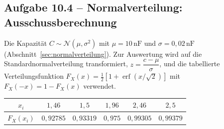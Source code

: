 \subsection*{Aufgabe 10.4 – Normalverteilung: Ausschussberechnung}

Die Kapazität $C \sim \mathcal{N}(\mu, \sigma^2)$ mit $\mu = 10\,\text{nF}$ und
$\sigma = 0{,}02\,\text{nF}$ (Abschnitt~\ref{sec:normalverteilung}). Zur
Auswertung wird auf die Standardnormalverteilung transformiert,
$z = \dfrac{c - \mu}{\sigma}$, und die tabellierte Verteilungsfunktion
$F_X(x) = \tfrac12\!\left[1 + \operatorname{erf}\!\left(x/\sqrt{2}\right)\right]$
mit $F_X(-x) = 1 - F_X(x)$ verwendet.

\begin{center}
\begin{tabular}{c|ccccc}
$x_i$ & $1{,}46$ & $1{,}5$ & $1{,}96$ & $2{,}46$ & $2{,}5$ \\ \hline
$F_X(x_i)$ & $0{,}92785$ & $0{,}93319$ & $0{,}975$ & $0{,}99305$ & $0{,}99379$ \\
\end{tabular}
\end{center}

